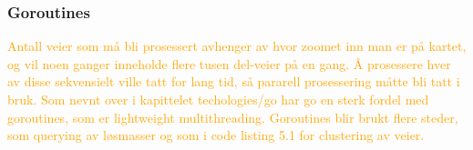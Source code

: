 
\subsubsection{Goroutines}

\textcolor{orange}{Antall veier som må bli prosessert avhenger av hvor zoomet inn man er på kartet, og vil noen ganger inneholde flere tusen del-veier på en gang. Å prosessere hver av disse sekvensielt ville tatt for lang tid, så pararell prosessering måtte bli tatt i bruk. Som nevnt over i kapittelet techologies/go har go en sterk fordel med goroutines, som er lightweight multithreading. Goroutines blir brukt flere steder, som querying av løsmasser og som i code listing 5.1 for clustering av veier. }

